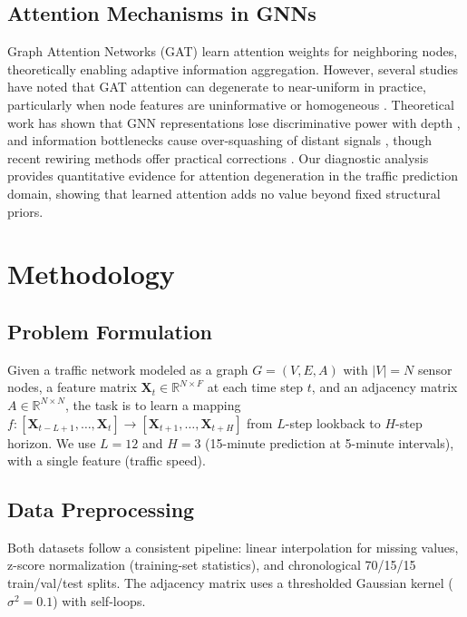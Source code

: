 \documentclass[letterpaper]{article}
\begin{document}
\subsection{Attention Mechanisms in GNNs}

Graph Attention Networks (GAT) \cite{velickovic2018graph} learn attention weights for neighboring nodes, theoretically enabling adaptive information aggregation. However, several studies have noted that GAT attention can degenerate to near-uniform in practice, particularly when node features are uninformative or homogeneous \cite{brody2021attentive}. Theoretical work has shown that GNN representations lose discriminative power with depth \cite{oono2020graph,li2018deeper}, and information bottlenecks cause over-squashing of distant signals \cite{topping2022oversquashing}, though recent rewiring methods offer practical corrections \cite{miquel2026rewiring}. Our diagnostic analysis provides quantitative evidence for attention degeneration in the traffic prediction domain, showing that learned attention adds no value beyond fixed structural priors.

\section{Methodology}

\subsection{Problem Formulation}

Given a traffic network modeled as a graph $G = (V, E, A)$ with $|V| = N$ sensor nodes, a feature matrix $\mathbf{X}_t \in \mathbb{R}^{N \times F}$ at each time step $t$, and an adjacency matrix $A \in \mathbb{R}^{N \times N}$, the task is to learn a mapping $f: [\mathbf{X}_{t-L+1}, \ldots, \mathbf{X}_t] \rightarrow [\mathbf{X}_{t+1}, \ldots, \mathbf{X}_{t+H}]$ from $L$-step lookback to $H$-step horizon. We use $L = 12$ and $H = 3$ (15-minute prediction at 5-minute intervals), with a single feature (traffic speed).

\subsection{Data Preprocessing}

Both datasets follow a consistent pipeline: linear interpolation for missing values, z-score normalization (training-set statistics), and chronological 70/15/15 train/val/test splits. The adjacency matrix uses a thresholded Gaussian kernel ($\sigma^2 = 0.1$) with self-loops.
\end{document}
